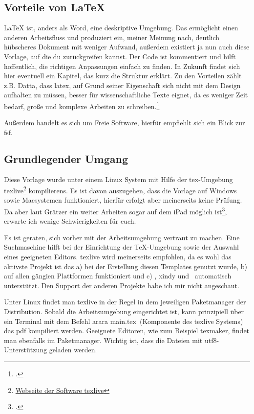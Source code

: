 \subsection{Vorteile von LaTeX}%
\label{sec:vort-von}
\LaTeX{} ist, anders als Word, eine deskriptive Umgebung. Das ermöglicht einen anderen Arbeitsfluss und produziert ein, meiner Meinung nach, deutlich hübscheres Dokument mit weniger Aufwand, außerdem existiert ja nun auch diese Vorlage, auf die du zurückgreifen kannst. Der Code ist kommentiert und hilft hoffentlich, die richtigen Anpassungen einfach zu finden. In Zukunft findet sich hier eventuell ein Kapitel, das kurz die Struktur erklärt.
Zu den Vorteilen zählt z.B. Datta, dass \gls{latex}, auf Grund seiner Eigenschaft sich nicht mit dem Design aufhalten zu müssen, besser für wissenschaftliche Texte eignet, da es weniger Zeit bedarf, große und komplexe Arbeiten zu schreiben.\footcite[Vgl. ][S. 1f.]{dilipLatex24Hours2017}

Außerdem handelt es sich um Freie Software, hierfür empfiehlt sich ein Blick zur \gls{fsf}.
\subsection{Grundlegender Umgang}
\label{sec:grundl}
Diese Vorlage wurde unter einem Linux System mit Hilfe der \gls{tex}-Umgebung texlive\footnote{\href{https://tug.org/texlive/}{Webseite der Software texlive}} \glspl{kompilieren}. Es ist davon auszugehen, dass die Vorlage auf Windows sowie Macsystemen funktioniert, hierfür erfolgt aber meinerseits keine Prüfung. Da aber laut Grätzer ein weiter Arbeiten sogar auf dem iPad möglich ist\footcite[Vgl. ][S. 179ff.]{gratzerPracticalLatex2014}, erwarte ich wenige Schwierigkeiten für euch.

Es ist geraten, sich vorher mit der Arbeitsumgebung vertraut zu machen. Eine Suchmaschine hilft bei der Einrichtung der TeX-Umgebung sowie der Auswahl eines geeigneten Editors. texlive wird meinerseits empfohlen, da es wohl das aktivste Projekt ist das a) bei der Erstellung diesen Templates genutzt wurde, b) auf allen gängien Plattformen funktioniert und c) , xindy und \ automatisch unterstützt. Den Support der anderen Projekte habe ich mir nicht angeschaut.

Unter Linux findet man texlive in der Regel in dem jeweiligen Paketmanager der Distribution. Sobald die Arbeitsumgebung eingerichtet ist, kann prinzipiell über ein Terminal mit dem Befehl \glqq arara main.tex\grqq\ (Komponente des texlive Systems) das pdf kompiliert werden.
Geeignete Editoren, wie zum Beispiel texmaker, findet man ebenfalls im Paketmanager. Wichtig ist, dass die Dateien mit \gls{utf8}-Unterstützung geladen werden.

